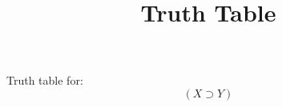 \documentclass{article}
\title{Truth Table}
\newcommand*{\oldneg}{\mathord{\sim}}
\begin{document}
\maketitle

\newlength{\lena}
\newlength{\lenb}
\newlength{\lenc}
\newlength{\lend}
\newlength{\lene}
\newlength{\lenf}
\newlength{\leng}

\settowidth{\lena}{$0$}
\settowidth{\lenb}{$1$}
\settowidth{\lenc}{$\supset$}
\settowidth{\lend}{$\equiv$}
\settowidth{\lene}{$\vee$}
\settowidth{\lenf}{$\wedge$}
\settowidth{\leng}{$\oldneg$}
\newlength{\lenA}
\settowidth{\lenA}{$A$}
\newlength{\lenB}
\settowidth{\lenB}{$B$}
\newlength{\lenC}
\settowidth{\lenC}{$C$}
\newlength{\lenD}
\settowidth{\lenD}{$D$}
\newlength{\lenE}
\settowidth{\lenE}{$E$}
\newlength{\lenF}
\settowidth{\lenF}{$F$}
\newlength{\lenG}
\settowidth{\lenG}{$G$}
\newlength{\lenH}
\settowidth{\lenH}{$H$}
\newlength{\lenI}
\settowidth{\lenI}{$I$}
\newlength{\lenJ}
\settowidth{\lenJ}{$J$}
\newlength{\lenK}
\settowidth{\lenK}{$K$}
\newlength{\lenL}
\settowidth{\lenL}{$L$}
\newlength{\lenM}
\settowidth{\lenM}{$M$}
\newlength{\lenN}
\settowidth{\lenN}{$N$}
\newlength{\lenO}
\settowidth{\lenO}{$O$}
\newlength{\lenP}
\settowidth{\lenP}{$P$}
\newlength{\lenQ}
\settowidth{\lenQ}{$Q$}
\newlength{\lenR}
\settowidth{\lenR}{$R$}
\newlength{\lenS}
\settowidth{\lenS}{$S$}
\newlength{\lenT}
\settowidth{\lenT}{$T$}
\newlength{\lenU}
\settowidth{\lenU}{$U$}
\newlength{\lenV}
\settowidth{\lenV}{$V$}
\newlength{\lenW}
\settowidth{\lenW}{$W$}
\newlength{\lenX}
\settowidth{\lenX}{$X$}
\newlength{\lenY}
\settowidth{\lenY}{$Y$}
\newlength{\lenZ}
\settowidth{\lenZ}{$Z$}
\newlength{\leftlen}
\newlength{\rightlen}
\settowidth{\leftlen}{$($}
\settowidth{\rightlen}{$)$}
Truth table for:
\[(X\supset Y)\]
\end{document}
